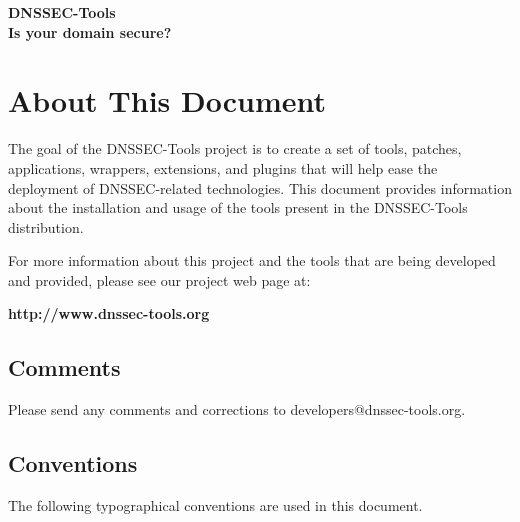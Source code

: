 \documentclass[12pt]{article}
\newcommand{\url}[1]{{\bf #1}}
\begin{document}
\clearpage

\begin{center}
{\Large
{\bf DNSSEC-Tools\\
Is your domain secure?}}
\end{center}
\tableofcontents
{}


\clearpage

\section{About This Document}
\label{about}

The goal of the DNSSEC-Tools project is to create a set of tools, patches,
applications, wrappers, extensions, and plugins that will help ease the
deployment of DNSSEC-related technologies. This document provides information
about the installation and usage of the tools present in the DNSSEC-Tools
distribution.

For more information about this project and the tools that are being developed
and provided, please see our project web page at:

\url{http://www.dnssec-tools.org}

\subsection{Comments}

Please send any comments and corrections to developers@dnssec-tools.org.

\vspace{1in}

\subsection{Conventions}

The following typographical conventions are used in this document.
\end{document}
